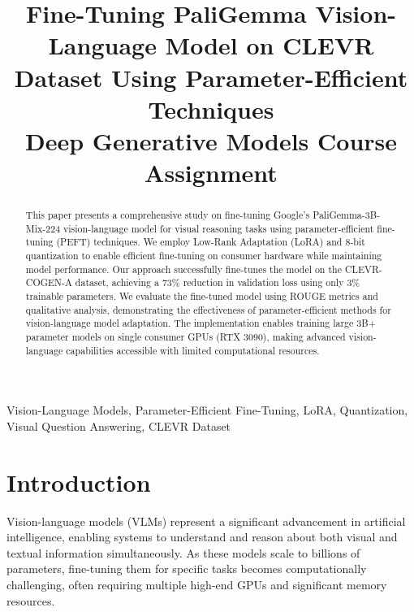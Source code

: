 \documentclass[conference]{IEEEtran}
\begin{document}
\title{Fine-Tuning PaliGemma Vision-Language Model on CLEVR Dataset Using Parameter-Efficient Techniques\\
{\footnotesize Deep Generative Models Course Assignment}
}

\author{
}

\maketitle

\begin{abstract}
This paper presents a comprehensive study on fine-tuning Google's PaliGemma-3B-Mix-224 vision-language model for visual reasoning tasks using parameter-efficient fine-tuning (PEFT) techniques. We employ Low-Rank Adaptation (LoRA) and 8-bit quantization to enable efficient fine-tuning on consumer hardware while maintaining model performance. Our approach successfully fine-tunes the model on the CLEVR-COGEN-A dataset, achieving a 73\% reduction in validation loss using only 3\% trainable parameters. We evaluate the fine-tuned model using ROUGE metrics and qualitative analysis, demonstrating the effectiveness of parameter-efficient methods for vision-language model adaptation. The implementation enables training large 3B+ parameter models on single consumer GPUs (RTX 3090), making advanced vision-language capabilities accessible with limited computational resources.
\end{abstract}

\begin{IEEEkeywords}
Vision-Language Models, Parameter-Efficient Fine-Tuning, LoRA, Quantization, Visual Question Answering, CLEVR Dataset
\end{IEEEkeywords}

\section{Introduction}

Vision-language models (VLMs) represent a significant advancement in artificial intelligence, enabling systems to understand and reason about both visual and textual information simultaneously. As these models scale to billions of parameters, fine-tuning them for specific tasks becomes computationally challenging, often requiring multiple high-end GPUs and significant memory resources.
\end{document}
